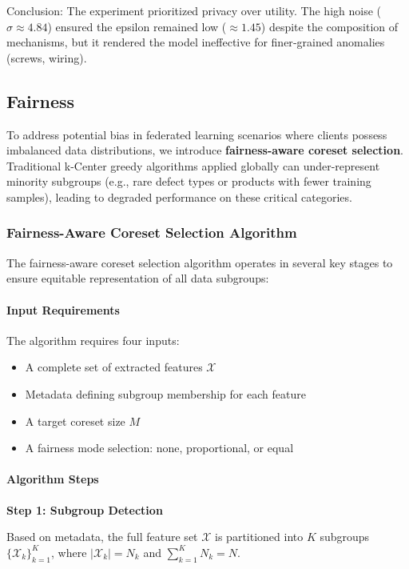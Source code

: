 \documentclass{article}
\begin{document}
Conclusion:
The experiment prioritized privacy over utility. The high noise ($\sigma \approx 4.84$) ensured the epsilon remained low ($\approx 1.45$) despite the composition of mechanisms, but it rendered the model ineffective for finer‑grained anomalies (screws, wiring).

\subsection{Fairness}

To address potential bias in federated learning scenarios where clients possess imbalanced data distributions, we introduce \textbf{fairness-aware coreset selection}. Traditional k-Center greedy algorithms applied globally can under-represent minority subgroups (e.g., rare defect types or products with fewer training samples), leading to degraded performance on these critical categories.

\subsubsection{Fairness-Aware Coreset Selection Algorithm}

The fairness-aware coreset selection algorithm operates in several key stages to ensure equitable representation of all data subgroups:

\paragraph{Input Requirements}

The algorithm requires four inputs:
\begin{itemize}
    \item A complete set of extracted features $\mathcal{X}$
    \item Metadata defining subgroup membership for each feature
    \item A target coreset size $M$
    \item A fairness mode selection: none, proportional, or equal
\end{itemize}

\paragraph{Algorithm Steps}

\textbf{Step 1: Subgroup Detection}

Based on metadata, the full feature set $\mathcal{X}$ is partitioned into $K$ subgroups $\{\mathcal{X}_k\}_{k=1}^K$, where $|\mathcal{X}_k| = N_k$ and $\sum_{k=1}^K N_k = N$.
\end{document}
